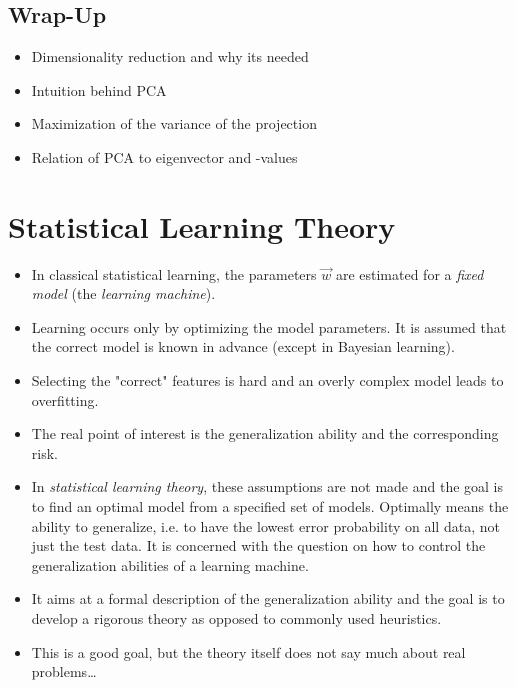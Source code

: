 	\section{Wrap-Up}
		\begin{itemize}
			\item Dimensionality reduction and why its needed
			\item Intuition behind PCA
			\item Maximization of the variance of the projection
			\item Relation of PCA to eigenvector and -values
		\end{itemize}

\chapter{Statistical Learning Theory}
	\begin{itemize}
		\item In classical statistical learning, the parameters \(\vec{w}\) are estimated for a \emph{fixed model} (the \emph{learning machine}).
		\item Learning occurs only by optimizing the model parameters. It is assumed that the correct model is known in advance (except in Bayesian learning).
		\item Selecting the "correct" features is hard and an overly complex model leads to overfitting.
		\item The real point of interest is the generalization ability and the corresponding risk.
		\item In \emph{statistical learning theory}, these assumptions are not made and the goal is to find an optimal model from a specified set of models. Optimally means the ability to generalize, i.e. to have the lowest error probability on all data, not just the test data. It is concerned with the question on how to control the generalization abilities of a learning machine.
		\item It aims at a formal description of the generalization ability and the goal is to develop a rigorous theory as opposed to commonly used heuristics.
		\item This is a good goal, but the theory itself does not say much about real problems\dots
	\end{itemize}

